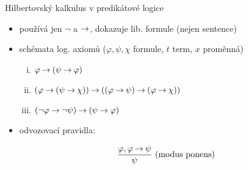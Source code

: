 \documentclass{beamer}
\begin{document}
\begin{frame}{Hilbertovský kalkulus v predikátové logice}

    \vspace{-6pt}
    \begin{itemize}
        \item používá jen $\neg$ a $\mathbin{\rightarrow}$, dokazuje lib. formule (nejen sentence)
        \item \alert{schémata log. axiomů} ($\varphi,\psi,\chi$ formule, $t$ term, $x$ proměnná)
        \begin{enumerate}[(i)]
            \item $\varphi \mathbin{\rightarrow} (\psi \mathbin{\rightarrow} \varphi)$
            \item $(\varphi\mathbin{\rightarrow} (\psi \mathbin{\rightarrow} \chi))\mathbin{\rightarrow} ((\varphi \mathbin{\rightarrow} \psi)\mathbin{\rightarrow}(\varphi \mathbin{\rightarrow} \chi))$
            \item $(\neg \varphi \mathbin{\rightarrow} \neg \psi)\mathbin{\rightarrow}(\psi \mathbin{\rightarrow} \varphi)$            
        \end{enumerate}

        \medskip


        \medskip

        \item \alert{odvozovací pravidla}:\vspace{-6pt}
        \begin{center}
            \begin{minipage}{0.45\textwidth}
                $$
                \frac{\varphi, \varphi \mathbin{\rightarrow} \psi}{\psi}\ \text{(modus ponens)}
                $$
            \end{minipage}          
            \begin{minipage}{0.45\textwidth}
            \end{minipage}            
        \end{center}        
        

\end{itemize}
\end{frame}
\end{document}
